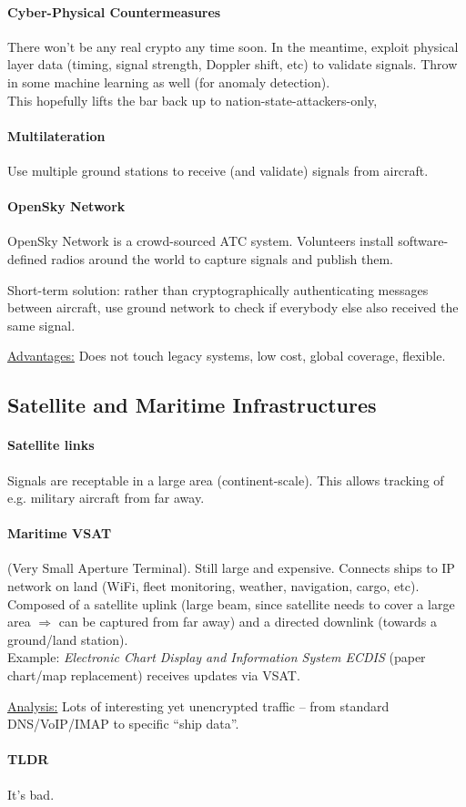 \paragraph{Cyber-Physical Countermeasures}
There won't be any real crypto any time soon.
In the meantime, exploit physical layer data (timing, signal strength, Doppler shift, etc) to validate signals.
Throw in some machine learning as well (for anomaly detection).
\\
This hopefully lifts the bar back up to nation-state-attackers-only,

\paragraph{Multilateration}
Use multiple ground stations to receive (and validate) signals from aircraft.

\paragraph{OpenSky Network}
OpenSky Network is a crowd-sourced ATC system. Volunteers install software-defined radios around the world to capture signals and publish them.

Short-term solution: rather than cryptographically authenticating messages between aircraft, use ground network to check if everybody else also received the same signal.

\underline{Advantages:}
Does not touch legacy systems, low cost, global coverage, flexible.



\subsection{Satellite and Maritime Infrastructures}

\paragraph{Satellite links}
Signals are receptable in a large area (continent-scale).
This allows tracking of e.g. military aircraft from far away.

\paragraph{Maritime VSAT} (Very Small Aperture Terminal). Still large and expensive.
Connects ships to IP network on land (WiFi, fleet monitoring, weather, navigation, cargo, etc).
Composed of a satellite uplink (large beam, since satellite needs to cover a large area $\Rightarrow$ can be captured from far away) and a directed downlink (towards a ground/land station).
\\
Example: \textit{Electronic Chart Display and Information System ECDIS} (paper chart/map replacement) receives updates via VSAT.

\underline{Analysis:}
Lots of interesting yet unencrypted traffic -- from standard DNS/VoIP/IMAP to specific ``ship data''.

\paragraph{TLDR} It's bad.

